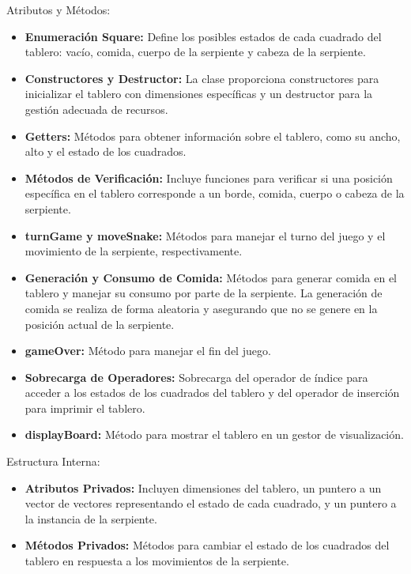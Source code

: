 Atributos y Métodos:

\begin{itemize}
    \item \textbf{Enumeración Square:} Define los posibles estados de cada cuadrado del tablero: vacío, comida, cuerpo de la serpiente y cabeza de la serpiente.
    \item \textbf{Constructores y Destructor:} La clase proporciona constructores para inicializar el tablero con dimensiones específicas y un destructor para la gestión adecuada de recursos.
    \item \textbf{Getters:} Métodos para obtener información sobre el tablero, como su ancho, alto y el estado de los cuadrados.
    \item \textbf{Métodos de Verificación:} Incluye funciones para verificar si una posición específica en el tablero corresponde a un borde, comida, cuerpo o cabeza de la serpiente.
    \item \textbf{turnGame y moveSnake:} Métodos para manejar el turno del juego y el movimiento de la serpiente, respectivamente.
    \item \textbf{Generación y Consumo de Comida:} Métodos para generar comida en el tablero y manejar su consumo por parte de la serpiente. La generación de comida se realiza de forma aleatoria y asegurando que no se genere en la posición actual de la serpiente.
    \item \textbf{gameOver:} Método para manejar el fin del juego.
    \item \textbf{Sobrecarga de Operadores:} Sobrecarga del operador de índice para acceder a los estados de los cuadrados del tablero y del operador de inserción para imprimir el tablero.
    \item \textbf{displayBoard:} Método para mostrar el tablero en un gestor de visualización.
\end{itemize}

Estructura Interna: 

\begin{itemize}
    \item \textbf{Atributos Privados:} Incluyen dimensiones del tablero, un puntero a un vector de vectores representando el estado de cada cuadrado, y un puntero a la instancia de la serpiente.
    \item \textbf{Métodos Privados:} Métodos para cambiar el estado de los cuadrados del tablero en respuesta a los movimientos de la serpiente.
\end{itemize}

